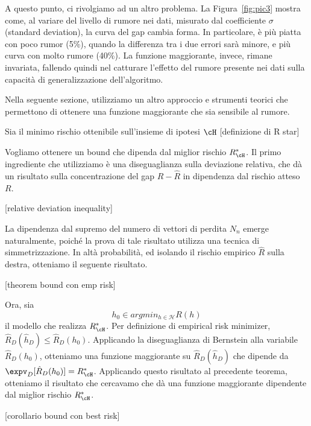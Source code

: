 A questo punto, ci rivolgiamo ad un altro problema. La Figura~\ref{fig:pic3} mostra come, al variare del livello di rumore nei dati, misurato dal coefficiente $\sigma$ (standard deviation), la curva del gap cambia forma. In particolare, è più piatta con poco rumor (5\%), quando la differenza tra i due errori sarà minore, e più curva con molto rumore (40\%). La funzione maggiorante, invece, rimane invariata, fallendo quindi nel catturare l'effetto del rumore presente nei dati sulla capacità di generalizzazione dell'algoritmo. 

Nella seguente sezione, utilizziamo un altro approccio e strumenti teorici che permettono di ottenere una funzione maggiorante che sia sensibile al rumore. 

Sia il minimo rischio ottenibile sull'insieme di ipotesi $\cH$ 
[definizione di R star]

Vogliamo ottenere un bound che dipenda dal miglior rischio $R^*_\cH$. Il primo ingrediente che utilizziamo è una diseguaglianza sulla deviazione relativa, che dà un risultato sulla concentrazione del gap $R-\hat R$ in dipendenza dal rischio atteso $R$.

[relative deviation inequality]

La dipendenza dal supremo del numero di vettori di perdita $N_n$ emerge naturalmente, poiché la prova di tale risultato utilizza una tecnica di simmetrizzazione. In altà probabilità, ed isolando il rischio empirico $\hat R$ sulla destra, otteniamo il seguente risultato. 

[theorem bound con emp risk]

Ora, sia 
\[
h_0 \in argmin_{h\in\mathcal H} R(h)
\]
il modello che realizza $R^*_\cH$. Per definizione di empirical risk minimizer, $\hat R_D(\hat h_D) \le \hat R_D(h_0)$. Applicando la diseguaglianza di Bernstein alla variabile $\hat R_D(h_0)$, otteniamo una funzione maggiorante su $\hat R_D(\hat h_D)$ che dipende da $\expv_D[\hat R_D(h_0)] = R^*_\cH$. Applicando questo risultato al precedente teorema, otteniamo il risultato che cercavamo che dà una funzione maggiorante dipendente dal miglior rischio $R^*_\cH$.

[corollario bound con best risk]

